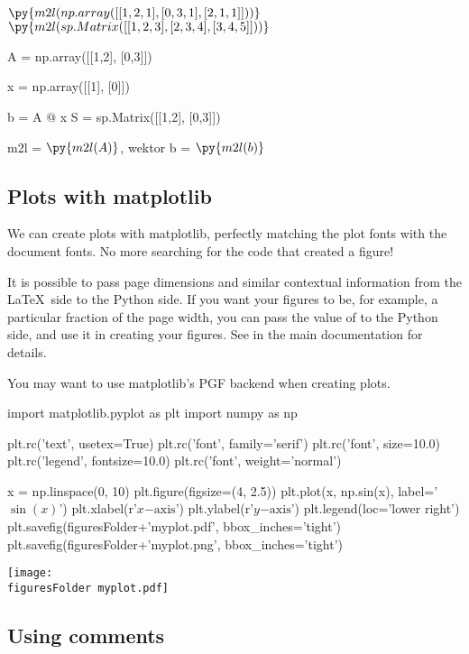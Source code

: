 \documentclass[11pt]{article}
\newcommand{\figuresFolder}{figures/}
\begin{document}
$\py{m2l(np.array([[1,2,1],
               [0,3,1],
               [2,1,1]]))}$
$\py{m2l(sp.Matrix([[1,2,3],
                 [2,3,4],
                 [3,4,5]]))}$

\begin{pycode}
A = np.array([[1,2],
               [0,3]])

x = np.array([[1],
               [0]])

b = A @ x
S = sp.Matrix([[1,2],
               [0,3]])
\end{pycode}

m2l = $\py{m2l(A)}$, 
\quad
wektor b = $\py{m2l(b)}$
\quad 
\subsection{Plots with matplotlib}

We can create plots with matplotlib, perfectly matching the plot fonts with the document fonts.  No more searching for the code that created a figure!

It is possible to pass page dimensions and similar contextual information from the \LaTeX\ side to the Python side.  If you want your figures to be, for example, a particular fraction of the page width, you can pass the value of  to the Python side, and use it in creating your figures.  See  in the main documentation for details.

You may want to use matplotlib's PGF backend when creating plots.

\begin{pyblock}
import matplotlib.pyplot as plt
import numpy as np

plt.rc('text', usetex=True)
plt.rc('font', family='serif')
plt.rc('font', size=10.0)
plt.rc('legend', fontsize=10.0)
plt.rc('font', weight='normal')

x = np.linspace(0, 10)
plt.figure(figsize=(4, 2.5))
plt.plot(x, np.sin(x), label='$\sin(x)$')
plt.xlabel(r'$x\mathrm{-axis}$')
plt.ylabel(r'$y\mathrm{-axis}$')
plt.legend(loc='lower right')
plt.savefig(figuresFolder+'myplot.pdf', bbox_inches='tight')
plt.savefig(figuresFolder+'myplot.png', bbox_inches='tight')
\end{pyblock}

\begin{center}
\texttt{[image: \\figuresFolder myplot.pdf]}
\end{center}



\subsection{Using comments}
\end{document}
